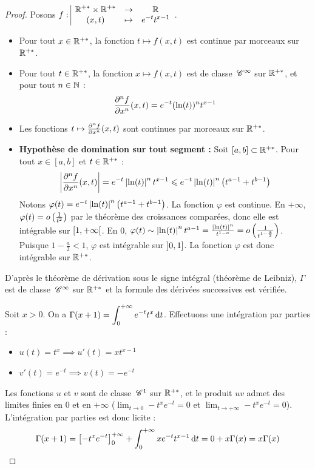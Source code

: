 \begin{proof}
    
    \svspace Posons $f: \space \begin{array}{|ccc} \displaystyle \mathbb{R}^{+*} \times \mathbb{R}^{+*} & \to & \displaystyle \mathbb{R} \\ \displaystyle (x,t) & \mapsto & \displaystyle e^{-t}t^{x-1} \end{array}$.
    \begin{itemize}
        \item Pour tout $x \in \mathbb{R}^{+*}$, la fonction $t \mapsto f(x,t)$ est continue par morceaux sur $\mathbb{R}^{+*}$.
        \item Pour tout $t \in \mathbb{R}^{+*}$, la fonction $x \mapsto f(x,t)$ est de classe $\,\mathscr C^{\infty}$ sur $\mathbb{R}^{+*}$, et pour tout $n \in \mathbb{N}$ :
        \[ \frac{\partial^{n} f}{\partial x^{n}}(x,t) = e^{-t}(\ln(t))^n t^{x-1} \]
        \item Les fonctions $t \mapsto \frac{\partial^{n} f}{\partial x^{n}}(x,t)$ sont continues par morceaux sur $\mathbb{R}^{+*}$.
        \item \textbf{Hypothèse de domination sur tout segment :} Soit $[a,b] \subset \mathbb{R}^{+*}$. Pour tout $x \in [a,b]$ et $t \in \mathbb{R}^{+*}$ :
        \[ \left|\frac{\partial^{n} f}{\partial x^{n}}(x,t)\right| = e^{-t}\left|\ln(t)\right|^n t^{x-1} \leqslant e^{-t}\left|\ln(t)\right|^n \left(t^{a-1} + t^{b-1}\right) \]
        Notons $\varphi(t) = e^{-t}\left|\ln(t)\right|^n \left(t^{a-1} + t^{b-1}\right)$. La fonction $\varphi$ est continue.
        En $+\infty$, $\varphi(t) = o\left(\frac{1}{t^2}\right)$ par le théorème des croissances comparées, donc elle est intégrable sur $\left[1, +\infty\right[$.
        En $0$, $\varphi(t) \sim \left|\ln(t)\right|^n t^{a-1} = \frac{\left|\ln(t)\right|^n}{t^{1-a}} = o\left(\frac{1}{t^{1-\frac{a}{2}}}\right)$.
        Puisque $1 - \frac{a}{2} < 1$, $\varphi$ est intégrable sur $\left]0, 1\right]$.
        La fonction $\varphi$ est donc intégrable sur $\mathbb{R}^{+*}$.
    \end{itemize}
    D'après le théorème de dérivation sous le signe intégral (théorème de Leibniz), $\Gamma$ est de classe $\,\mathscr C^{\infty}$ sur $\mathbb{R}^{+*}$ et la formule des dérivées successives est vérifiée.

    
    \svspace Soit $x > 0$. On a $\Gamma(x+1) = \displaystyle\int_0^{+\infty} e^{-t} t^x \,\mathrm{d}t$.
    Effectuons une intégration par parties :
    \begin{itemize}
        \item $u(t) = t^x \implies u'(t) = x t^{x-1}$
        \item $v'(t) = e^{-t} \implies v(t) = -e^{-t}$
    \end{itemize}
    Les fonctions $u$ et $v$ sont de classe $\,\mathscr C^{1}$ sur $\mathbb{R}^{+*}$, et le produit $uv$ admet des limites finies en $0$ et en $+\infty$ ($\lim_{t\to 0} -t^x e^{-t} = 0$ et $\lim_{t\to+\infty} -t^x e^{-t} = 0$). L'intégration par parties est donc licite :
    \[ \Gamma(x+1) = \left[-t^x e^{-t}\right]_0^{+\infty} + \int_0^{+\infty} x e^{-t} t^{x-1} \,\mathrm{d}t = 0 + x \Gamma(x) = x \Gamma(x) \]


\end{proof}
